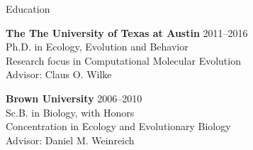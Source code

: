 \documentclass{resume} %
\begin{document}
\vspace*{0.35cm}
\begin{rSection}{Education}
\vspace*{0.25cm}

{\bf The The University of Texas at Austin} \hfill {2011--2016} \\
Ph.D. in Ecology, Evolution and Behavior \\
Research focus in Computational Molecular Evolution \\
Advisor: Claus O. Wilke \\

\smallskip

{\bf Brown University} \hfill {2006--2010} \\
Sc.B. in Biology, with Honors \\
Concentration in Ecology and Evolutionary Biology \\
Advisor: Daniel M. Weinreich \\

\end{rSection}

\end{document}
